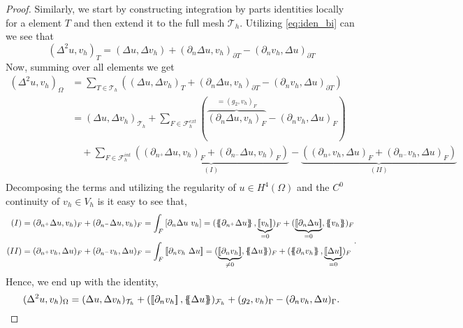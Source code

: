 \begin{proof}

  Similarly, we start by constructing integration by parts identities locally for a element $T$ and then extend it to the full mesh $\mathcal{T}_{h} $.
Utilizing \eqref{eq:iden_bi} can we see that \[
( \Delta ^2 u, v_{h} ) _{T} = ( \Delta u, \Delta v_{h}) +  ( \partial _{n} \Delta u, v_{h})_{\partial T} - ( \partial _{n} v_{h}, \Delta u) _{\partial T}
\]
Now, summing over all elements we get \[
    \begin{split}
( \Delta ^2 u, v_{h} ) _{\Omega } & = \sum_{T \in \mathcal{T}_{h} }^{}  \left( ( \Delta u, \Delta v_{h})_{T}
+  ( \partial _{n} \Delta u, v_{h})_{\partial T} - ( \partial _{n} v_{h}, \Delta u) _{\partial T} \right)  \\
 & =   ( \Delta u, \Delta v_{h})_{\mathcal{T} _{h}} +  \sum_{F \in \mathcal{F}_{h}^{ext} }^{}
 (\overbrace{( \partial _{n} \Delta u, v_{h})_{ F}}^{=( g_{2},v_{h})_{F} }  - ( \partial _{n} v_{h}, \Delta u) _{F}) \\
  &   \quad + \sum_{F \in \mathcal{F}_{h}^{int} }^{} \underbrace{( ( \partial _{n^{+}} \Delta u, v_{h})_{ F} + ( \partial _{n^{-}} \Delta u, v_{h})_{ F} )}_{(I)}  - \underbrace{( ( \partial _{n^{+}} v_{h}, \Delta u) _{F} + ( \partial _{n^{-}} v_{h}, \Delta u) _{F}
  )}_{(II)}   \\
    \end{split}
\]
Decomposing the terms and utilizing the regularity of $u \in H^{4}( \Omega ) $ and the $C^{0}$ continuity of $v_{h}\in V_{h}$ is it easy to see that,    \[
\begin{split}
    (I) & = ( \partial _{n^{+}} \Delta u, v_{h})_{ F} + ( \partial _{n^{-}} \Delta u, v_{h})_{ F}  = \int_{F}^{} \left[ \partial _{n} \Delta u \  v_{h} \right] =  (  \mean{ \partial _{n^{+}} \Delta u } , \underbrace{\jump{v_{h}  }}_{ = 0}      )_{ F} + (  \underbrace{\jump{ \partial _{n}
    \Delta u }}_{=0}  , \mean{v_{h}  }     )_{ F} \\
    (II) &=  ( \partial _{n^{+}} v_{h}, \Delta u) _{F} + ( \partial _{n^{-}} v_{h}, \Delta u) _{F} = \int_{F}^{} \jump{ \partial _{n} v_{h} \ \Delta u } =  ( \underbrace{\jump{ \partial _{n} v_{h}}}_{ \neq 0 } , \mean{ \Delta u })_{F}  + ( \mean{
    \partial _{n} v_{h}}, \underbrace{\jump{ \Delta u
    }}_{=0} )_{F}
\end{split} .
\]
Hence, we end up with the identity,
\[
( \Delta ^2 u, v_{h} ) _{\Omega } = ( \Delta u, \Delta v_{h})_{\mathcal{T} _{h} }  +  ( \left[\!\left[  \partial _{n} v_{h} \right]\!\right] , \left\{\!\!\left\{ \Delta u \right\}\!\!\right\})_{\mathcal{F}_{h} }  + ( g_{2} , v_{h} )_{\Gamma } - ( \partial _{n} v_{h}, \Delta u)_{\Gamma }.
\]


\end{proof}
